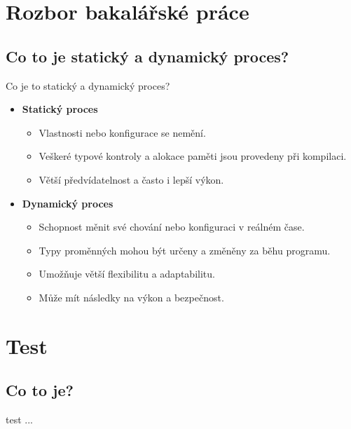 \documentclass{beamer}
\begin{document}
\section{Rozbor bakalářské práce}
\subsection{Co to je statický a dynamický proces?}
\begin{frame}{Co je to statický a dynamický proces?}
	\begin{itemize}
		\item \textbf{Statický proces}
			\begin{itemize}
				\item[\textendash] Vlastnosti nebo konfigurace se nemění.
				\item[\textendash] Veškeré typové kontroly a alokace paměti jsou provedeny při kompilaci.
				\item[\textendash] Větší předvídatelnost a často i lepší výkon.
			\end{itemize}
		\item \textbf{Dynamický proces}
			\begin{itemize}
				\item[\textendash] Schopnost měnit své chování nebo konfiguraci v reálném čase.
				\item[\textendash] Typy proměnných mohou být určeny a změněny za běhu programu.
				\item[\textendash] Umožňuje větší flexibilitu a adaptabilitu.
				\item[\textendash] Může mít následky na výkon a bezpečnost.
			\end{itemize}
	\end{itemize}

\end{frame}

\section{Test}
\subsection{Co to je?}
\begin{frame}{test}
...
\end{frame}
\end{document}
